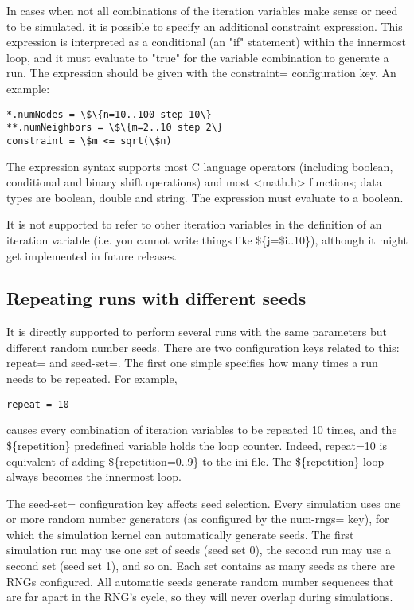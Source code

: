 In cases when not all combinations of the iteration variables make sense
or need to be simulated, it is possible to specify an additional
constraint expression. This expression is interpreted as a conditional
(an "if" statement) within the innermost
loop, and it must evaluate to "true" for
the variable combination to generate a run. The expression should be
given with the constraint= configuration key. An example:

\begin{Verbatim}[commandchars=\\\{\}]
*.numNodes = \$\{n=10..100 step 10\}
**.numNeighbors = \$\{m=2..10 step 2\}
constraint = \$m <= sqrt(\$n)
\end{Verbatim}


The expression syntax supports most C language operators (including
boolean, conditional and binary shift operations) and most
<math.h> functions; data types are boolean,
double and string. The expression must evaluate to a boolean.

\begin{note}
    It is not supported to refer to other iteration variables
    in the definition of an iteration variable (i.e. you cannot write
    things like \$\{j=\$i..10\}), although it might get implemented in
    future {\opp} releases.
\end{note}

\subsection{Repeating runs with different seeds}

It is directly supported to perform several runs with the same
parameters but different random number seeds. There are two
configuration keys related to this: repeat= and seed-set=. The first
one simple specifies how many times a run needs to be repeated. For
example,

\begin{Verbatim}[commandchars=\\\{\}]
repeat = 10
\end{Verbatim}

causes every combination of iteration variables to be repeated 10 times,
and the \$\{repetition\} predefined variable holds the loop counter.
Indeed, repeat=10 is equivalent of adding \$\{repetition=0..9\} to the
ini file. The \$\{repetition\} loop always becomes the innermost loop.

The seed-set= configuration key affects seed selection. Every
simulation uses one or more random number generators (as configured by
the num-rngs= key), for which the simulation kernel can automatically
generate seeds. The first simulation run may use one set of seeds (seed
set 0), the second run may use a second set (seed set 1), and so on.
Each set contains as many seeds as there are RNGs configured. All
automatic seeds generate random number sequences that are far apart in
the RNG's cycle, so they will never overlap during
simulations.

